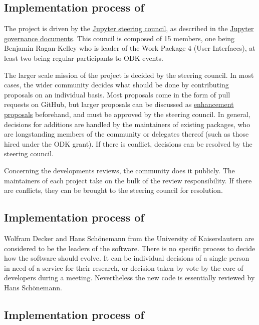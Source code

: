 \documentclass{deliverablereport}
\begin{document}
\subsection{Implementation process of \Jupyter}

The \Jupyter project is driven by the \href{https://jupyter.org/about.html}{Jupyter steering council}, as described in the \href{https://github.com/jupyter/governance}{Jupyter governance documents}. This council is composed of 15 members, one being Benjamin Ragan-Kelley who is leader of the Work Package 4 (User Interfaces),  at least two being regular participants to ODK events.

The larger scale mission of the project is decided by the steering council. In most cases, the wider \Jupyter community decides what should be done by contributing proposals on an individual basis. Most proposals come in the form of pull requests on GitHub, but larger proposals can be discussed as \href{https://github.com/jupyter/enhancement-proposals}{enhancement proposals} beforehand, and must be approved by the steering council. In general, decisions for additions are handled by the maintainers of existing packages, who are longstanding members of the community or delegates thereof (such as those hired under the ODK grant). If there is conflict, decisions can be resolved by the steering council.

Concerning the developments reviews, the \Jupyter community does it publicly. The maintainers of each project take on the bulk of the review responsibility. If there are conflicts, they can be brought to the steering council for resolution.


\subsection{Implementation process of \Singular}

Wolfram Decker and Hans Schönemann from the University of Kaiserslautern are considered to be the leaders of the \Singular software.
There is no specific process to decide how the software should evolve. It can be individual decisions of a single person in need of a service for their research, or decision taken by vote by the core of \Singular developers during a meeting.
Nevertheless the new code is essentially reviewed by Hans Schönemann.

\subsection{Implementation process of \GAP}
\end{document}
